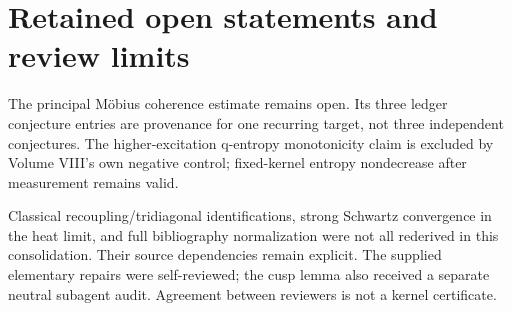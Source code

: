 \section{Retained open statements and review limits}

The principal M\"obius coherence estimate remains open. Its three ledger conjecture entries are provenance for one recurring target, not three independent conjectures. The higher-excitation q-entropy monotonicity claim is excluded by Volume VIII's own negative control; fixed-kernel entropy nondecrease after measurement remains valid.

Classical recoupling/tridiagonal identifications, strong Schwartz convergence in the heat limit, and full bibliography normalization were not all rederived in this consolidation. Their source dependencies remain explicit. The supplied elementary repairs were self-reviewed; the cusp lemma also received a separate neutral subagent audit. Agreement between reviewers is not a kernel certificate.
